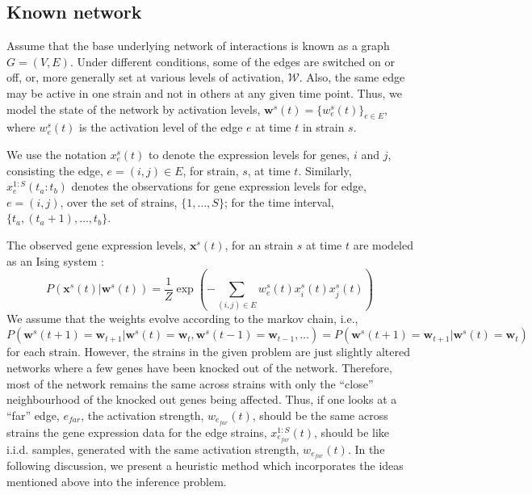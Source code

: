 \documentclass{bioinfo}
\begin{document}
\begin{methods}
\subsection{Known network}
Assume that the base underlying network of interactions is known as a
graph $G=(V,E)$. Under different conditions, some of the edges are 
switched on or off, or, more generally set at various levels of
activation, $\mathcal W$. Also, the same edge may be active in one
strain and not in others at any given time point. Thus, we model the
state of the network by activation levels, $\mathbf{w}^{s}(t) = \{w^s_{e}(t)\}_{e
\in E}$, where $w^s_{e}(t)$ is the activation level of the edge $e$ at time $t$ in strain $s$. 

We use the notation $x^{s}_{e}(t)$ to denote the expression
levels for genes, $i$ and $j$, consisting the edge, $e=(i,j)\in E$,
for strain, $s$, at time $t$. Similarly,  $x_{e}^{1:S}(t_{a}:t_{b})$
denotes the observations for gene expression levels for edge,
$e=(i,j)$, over the set of strains, $\{1,\ldots, S\}$; for the time
interval, $\{t_{a}, (t_{a}+1), \ldots, t_{b}\}$. 

The observed gene expression levels, $\mathbf{x}^{s}(t)$, for an strain
$s$ at time $t$ are modeled as an Ising system \cite{Song09KELLER}:
\begin{equation}
\label{eq:ising}
 P\left(\mathbf{x}^{s}(t) | \mathbf{w}^{s}(t)\right) = 
      \frac{1}{Z} \exp \left( - \sum_{(i,j) \in E} w^s_{e}(t)
        x^{s}_i(t) x^{s}_j(t)\right)  
\end{equation}
We assume that the weights evolve according to the markov chain, i.e.,
$P(\mathbf{w}^{s}(t+1) = \mathbf{w}_{t+1} |  \mathbf{w}^{s}(t) =
  \mathbf{w}_{t}, \mathbf{w}^{s}(t-1) = \mathbf{w}_{t-1},
  \ldots) = P\left(\mathbf{w}^{s}(t+1) = \mathbf{w}_{t+1} |  \mathbf{w}^{s}(t) =
  \mathbf{w}_{t}\right)$ for each strain. 
However, the strains in the given problem are just slightly altered
networks where a few genes have been knocked out of the
network. Therefore, most of the network remains the same across
strains with only the ``close'' neighbourhood of the knocked out genes
being affected. Thus, if one looks at a ``far'' edge,
$e_{far}$, the activation strength, $w_{e_{far}}(t)$, should be the
same across strains  the gene expression data for the edge strains,
$x^{1:S}_{e_{far}}(t)$, should be like i.i.d. samples, generated with
the same activation strength, $w_{e_{far}}(t)$. In the following discussion, 
we present a heuristic method which incorporates the ideas mentioned
above into the inference problem. 

\end{methods}
\end{document}
